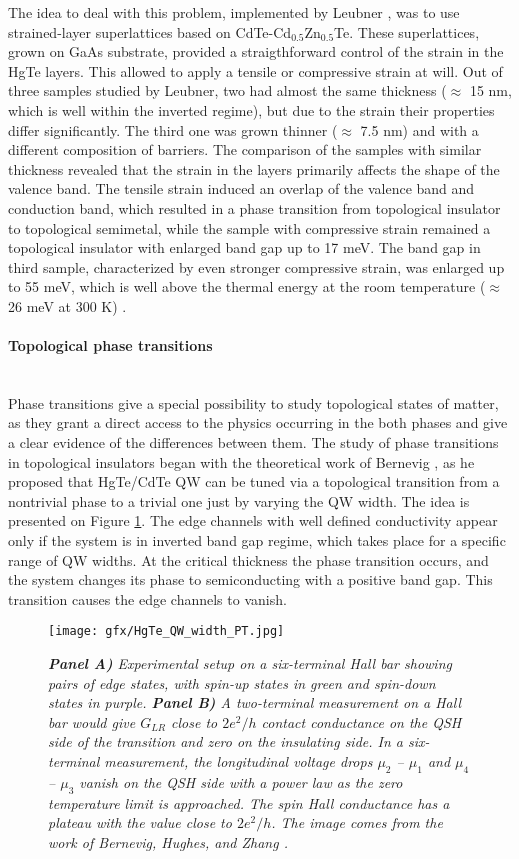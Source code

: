 \documentclass[titlepage,a4paper]{book}
\newcommand{\wciecie}{\quad\phantom{v}}
\newcommand{\myparagraph}[1]{\paragraph{#1}\mbox{}\\}
\begin{document}
The idea to deal with this problem, implemented by Leubner \cite{Leubner_State}, was to use strained-layer superlattices based on CdTe-Cd$_{0.5}$Zn$_{0.5}$Te. These superlattices, grown on GaAs substrate, provided a straigthforward control of the strain in the HgTe layers. This allowed to apply a tensile or compressive strain at will. Out of three samples studied by Leubner, two had almost the same thickness ($\approx$ 15 nm, which is well within the inverted regime), but due to the strain their properties differ significantly. The third one was grown thinner ($\approx$ 7.5 nm) and with a different composition of barriers. The comparison of the samples with similar thickness revealed that the strain in the layers primarily affects the shape of the valence band. The tensile strain induced an overlap of the valence band and conduction band, which resulted in a phase transition from topological insulator to topological semimetal, while the sample with compressive strain remained a topological insulator with enlarged band gap up to 17 meV. The band gap in third sample, characterized by even stronger compressive strain, was enlarged up to 55 meV, which is well above the thermal energy at the room temperature ($\approx$ 26 meV at 300 K) \cite{Leubner_State}. 

\myparagraph{Topological phase transitions}
\wciecie
Phase transitions give a special possibility to study topological states of matter, as they grant a direct access to the physics occurring in the both phases and give a clear evidence of the differences between them. The study of phase transitions in topological insulators began with the theoretical work of Bernevig \cite{Bernevig_Topology2}, as he proposed that HgTe/CdTe QW can be tuned via a topological transition from a nontrivial phase to a trivial one just by varying the QW width. The idea is presented on Figure \ref{fig:HgTe_QW_width_PT}. The edge channels with well defined conductivity appear only if the system is in inverted band gap regime, which takes place for a specific range of QW widths. At the critical thickness the phase transition occurs, and the system changes its phase to semiconducting with a positive band gap. This transition causes the edge channels to vanish.

\begin{figure}[ht]
	\centering
	\texttt{[image: gfx/HgTe\_QW\_width\_PT.jpg]}
	\vspace{-10pt}
	\caption{\textit{\textbf{Panel A)} Experimental setup on a six-terminal Hall bar showing pairs of edge states, with spin-up states in green and spin-down states in purple. \textbf{Panel B)} A two-terminal measurement on a Hall bar would give $G_{LR}$ close to $2e^2/h$ contact conductance on the QSH side of the transition and zero on the insulating side. In a six-terminal measurement, the longitudinal voltage drops $\mu_2$ -- $\mu_1$ and $\mu_4$ -- $\mu_3$ vanish on the QSH side with a power law as the zero temperature limit is approached. The spin Hall conductance has a plateau with the value close to $2e^2/h$. The image comes from the work of Bernevig, Hughes, and Zhang \cite{Bernevig_Topology2}.}}
	\label{fig:HgTe_QW_width_PT}
\end{figure} 
\end{document}
